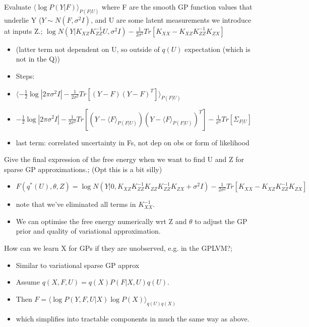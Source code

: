 \documentclass{article}
\begin{document}
Evaluate $\langle \log P(Y|F)\rangle_{P(F|U)}$ where F are the smooth GP function values that underlie Y ($Y\sim N(F, \sigma^2I)$, and U are some latent measurements we introduce at inputs Z.; $\log N(Y|K_{XZ}K_{ZZ}^{-1}U, \sigma^2I)-\frac{1}{2\sigma^2}Tr[K_{XX}-K_{XZ}K_{ZZ}^{-1}K_{ZX}]$ \begin{itemize} \item (latter term not dependent on U, so outside of $q(U)$ expectation (which is not in the Q)) \item Steps: \item $\langle -\frac{1}{2}\log|2\pi\sigma^2I|-\frac{1}{2\sigma^2}Tr[(Y-F)(Y-F)^T]\rangle_{P(F|U)}$ \item $-\frac{1}{2}\log|2\pi\sigma^2I|-\frac{1}{2\sigma^2}Tr[(Y-\langle F\rangle_{P(F|U)})(Y-\langle F\rangle_{P(F|U)})^T]-\frac{1}{\sigma^2}Tr[\Sigma_{F|U}]$ \item last term: correlated uncertainty in Fs, not dep on obs or form of likelihood \end{itemize}

Give the final expression of the free energy when we want to find U and Z for sparse GP approximations.; (Opt this is a bit silly)  \begin{itemize} \item $F(q^*(U), \theta, Z)=\log N(Y|0, K_{XZ}K^{-1}_{ZZ}K_{ZZ}K_{ZZ}^{-1}K_{ZX}+\sigma^2I) -\frac{1}{2\sigma^2}Tr[K_{XX}-K_{XZ}K_{ZZ}^{-1}K_{ZX}]$ \item note that we've eliminated all terms in $K_{XX}^{-1}$. \item We can optimise the free energy numerically  wrt Z and $\theta$ to adjust the GP prior and quality of variational approximation. \end{itemize}

How can we learn X for GPs if they are unobserved, e.g. in the GPLVM?; \begin{itemize} \item Similar to variational sparse GP approx \item Assume $q(X, F, U)=q(X)P(F|X, U)q(U)$. \item Then $F=\langle \log P(Y, F, U|X)\log P(X)\rangle_{q(U)q(X)}$  \item which simplifies into tractable components in much the same way as above. \end{itemize}
\end{document}
